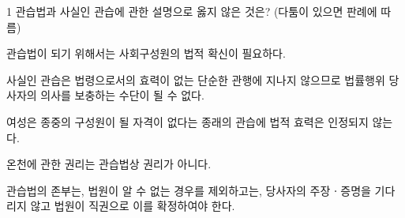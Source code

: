 \begin{question}{1}
관습법과 사실인 관습에 관한 설명으로 옳지 않은 것은? (다툼이 있으면 판례에 따름)
\begin{choices}
  \item 관습법이 되기 위해서는 사회구성원의 법적 확신이 필요하다.
  \item 사실인 관습은 법령으로서의 효력이 없는 단순한 관행에 지나지 않으므로 법률행위 당사자의 의사를 보충하는 수단이 될 수 없다.
  \item 여성은 종중의 구성원이 될 자격이 없다는 종래의 관습에 법적 효력은 인정되지 않는다.
  \item 온천에 관한 권리는 관습법상 권리가 아니다.
  \item 관습법의 존부는, 법원이 알 수 없는 경우를 제외하고는, 당사자의 주장ㆍ증명을 기다리지 않고 법원이 직권으로 이를 확정하여야 한다.
\end{choices}
\end{question}
